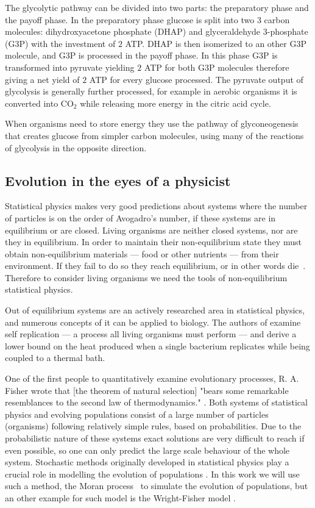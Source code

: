 \documentclass[a4paper,12pt]{article}
\begin{document}
The glycolytic pathway can be divided into two parts: the preparatory phase and the payoff phase. In the preparatory phase glucose is split into two $3$ carbon molecules: dihydroxyacetone phosphate (DHAP) and glyceraldehyde 3-phosphate (G3P) with the investment of $2$ ATP. DHAP is then isomerized to an other G3P molecule, and G3P is processed in the payoff phase. In this phase G3P is transformed into pyruvate yielding $2$ ATP for both G3P molecules therefore giving a net yield of $2$ ATP for every glucose processed. The pyruvate output of glycolysis is generally further processed, for example in aerobic organisms it is converted into CO$_2$ while releasing more energy in the citric acid cycle. 

When organisms need to store energy they use the pathway of glyconeogenesis that creates glucose from simpler carbon molecules, using many of the reactions of glycolysis in the opposite direction. %
	\subsection{Evolution in the eyes of a physicist}\label{chap:whereisphysics}

	Statistical physics makes very good predictions about systems where the number of particles is on the order of Avogadro's number, if these systems are in equilibrium or are closed. Living organisms are neither closed systems, nor are they in equilibrium. In order to maintain their non-equilibrium state they must obtain non-equilibrium materials --- food or other nutrients --- from their environment. If they fail to do so they reach equilibrium, or in other words die~\cite{irreversibility}. Therefore to consider living organisms we need the tools of non-equilibrium statistical physics. 

	Out of equilibrium systems are an actively researched area in statistical physics, and numerous concepts of it can be applied to biology. The authors of \cite{selfreplication} examine self replication --- a process all living organisms must perform --- and derive a lower bound on the heat produced when a single bacterium replicates while being coupled to a thermal bath. 
	
	One of the first people to quantitatively examine evolutionary processes, R. A. Fisher wrote that [the theorem of natural selection] "bears some remarkable resemblances to the second law of thermodynamics." \cite{fisherevolution}. Both systems of statistical physics and evolving populations consist of a large number of particles (organisms) following relatively simple rules, based on probabilities. Due to the probabilistic nature of these systems exact solutions are very difficult to reach if even possible, so one can only predict the large scale behaviour of the whole system. Stochastic methods originally developed in statistical physics play a crucial role in modelling the evolution of populations \cite{stochasticblythe}. In this work we will use such a method, the Moran process \cite{moranprocess}~to simulate the evolution of populations, but an other example for such model is the Wright-Fisher model \cite{mathematicalpopgen}.
\end{document}
